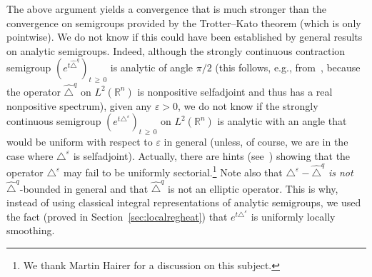 \documentclass[AHL,Unicode,published]{cedram}
\newcommand*\R{\mathbb{R}}
\renewcommand{\geq}{\geqslant}
\begin{document}
\begin{rema}
The above argument yields a convergence that is much stronger than the convergence on semigroups provided by the Trotter--Kato theorem (which is only pointwise). We do not know if this could have been established by general results on analytic semigroups. Indeed, although the strongly continuous contraction semigroup $(e^{t\widehat{\triangle}^{q}})_{t\,\geq\,0}$ is analytic of angle $\pi/2$ (this follows, e.g., from~\cite[Chapter~II, Corollary~4.7]{EngelNagel}, because the operator $\widehat{\triangle}^{q}$ on $L^2(\R^n)$ is nonpositive selfadjoint and thus has a real nonpositive spectrum), given any $\varepsilon>0$, we do not know if the strongly continuous semigroup $(e^{t\triangle^\varepsilon})_{t\,\geq\,0}$ on $L^2(\R^n)$ is analytic with an angle that would be uniform with respect to $\varepsilon$ in general (unless, of course, we are in the case where $\triangle^\varepsilon$ is selfadjoint). Actually, there are hints (see~\cite{EckmannHairer}) showing that the operator $\triangle^\varepsilon$ may fail to be uniformly sectorial.\footnote{We thank Martin Hairer for a discussion on this subject.} Note also that $\triangle^\varepsilon-\widehat{\triangle}^{q}$ \emph{is not} $\widehat{\triangle}^{q}$-bounded in general and that $\widehat{\triangle}^{q}$ is not an elliptic operator. This is why, instead of using classical integral representations of analytic semigroups, we used the fact (proved in Section~\ref{sec:localregheat}) that $e^{t\triangle^\varepsilon}$ is uniformly locally smoothing.
\end{rema}
\end{document}

